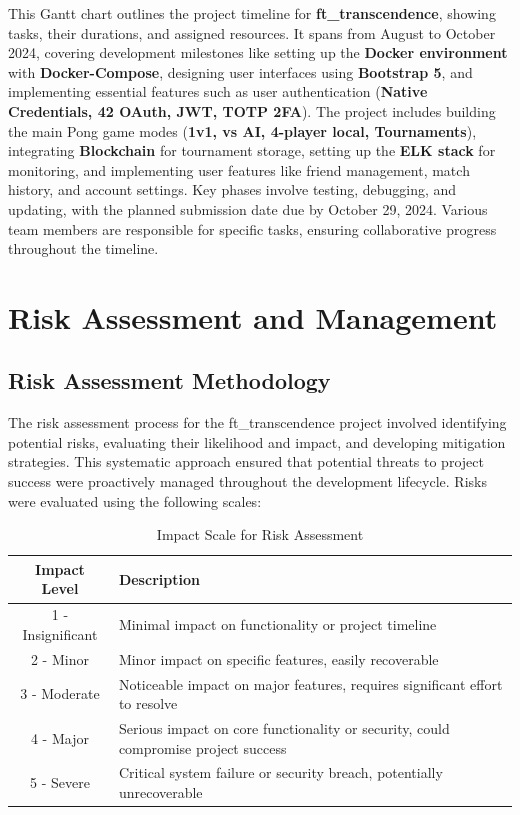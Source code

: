 This Gantt chart outlines the project timeline for \textbf{ft\_transcendence}, showing tasks, their durations, and assigned resources. It spans from August to October 2024, covering development milestones like setting up the \textbf{Docker environment} with \textbf{Docker-Compose}, designing user interfaces using \textbf{Bootstrap 5}, and implementing essential features such as user authentication (\textbf{Native Credentials, 42 OAuth, JWT, TOTP 2FA}). The project includes building the main Pong game modes (\textbf{1v1, vs AI, 4-player local, Tournaments}), integrating \textbf{Blockchain} for tournament storage, setting up the \textbf{ELK stack} for monitoring, and implementing user features like friend management, match history, and account settings. Key phases involve testing, debugging, and updating, with the planned submission date due by October 29, 2024. Various team members are responsible for specific tasks, ensuring collaborative progress throughout the timeline.

\section{Risk Assessment and Management}

\subsection{Risk Assessment Methodology}
The risk assessment process for the ft\_transcendence project involved identifying potential risks, evaluating their likelihood and impact, and developing mitigation strategies. This systematic approach ensured that potential threats to project success were proactively managed throughout the development lifecycle. Risks were evaluated using the following scales:

\begin{table}[H]
    \centering
    \renewcommand{\arraystretch}{1.5}
    \begin{tabular}{|c|p{12cm}|}
    \hline
    \textbf{Impact Level} & \textbf{Description} \\
    \hline
    1 - Insignificant & Minimal impact on functionality or project timeline \\
    \hline
    2 - Minor & Minor impact on specific features, easily recoverable \\
    \hline
    3 - Moderate & Noticeable impact on major features, requires significant effort to resolve \\
    \hline
    4 - Major & Serious impact on core functionality or security, could compromise project success \\
    \hline
    5 - Severe & Critical system failure or security breach, potentially unrecoverable \\
    \hline
    \end{tabular}
    \caption{Impact Scale for Risk Assessment}
    \label{tab:impact_scale}
\end{table}

